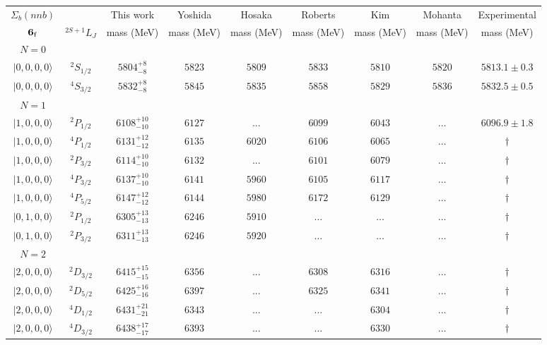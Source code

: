 \begin{tabular}{c c| c c c c c c c}\hline \hline
$\Sigma_{b}(nnb)$&                  & This work   &   Yoshida     &  Hosaka      &  Roberts    & Kim        & Mohanta    & Experimental  \\ 
${\bf {6}}_{\rm f}$  & $^{2S+1}L_{J}$ & mass (MeV)  &   mass (MeV)  &  mass (MeV)  &  mass (MeV) & mass (MeV) & mass (MeV) &      mass (MeV) \\ \hline
\hline
 $N=0$  &  &  &  &  &  \\ 
$\vert 0,0,0,0 \rangle $ & $^{2}S_{1/2}$ & $5804^{+8}_{-8}$ & $5823$ & $5809$ & $5833$ & $5810$ & $5820$ & $5813.1\pm 0.3$ \\ 
$\vert 0,0,0,0 \rangle $ & $^{4}S_{3/2}$ & $5832^{+8}_{-8}$ & $5845$ & $5835$ & $5858$ & $5829$ & $5836$ & $5832.5\pm 0.5$ \\ 
\hline
 $N=1$  &  &  &  &  &  \\ 
$\vert 1,0,0,0 \rangle $ & $^{2}P_{1/2}$ & $6108^{+10}_{-10}$ & $6127$ & ... & $6099$ & $6043$ & ... & $6096.9\pm 1.8$ \\ 
$\vert 1,0,0,0 \rangle $ & $^{4}P_{1/2}$ & $6131^{+12}_{-12}$ & $6135$ & $6020$ & $6106$ & $6065$ & ... & $\dagger$ \\ 
$\vert 1,0,0,0 \rangle $ & $^{2}P_{3/2}$ & $6114^{+10}_{-10}$ & $6132$ & ... & $6101$ & $6079$ & ... & $\dagger$ \\ 
$\vert 1,0,0,0 \rangle $ & $^{4}P_{3/2}$ & $6137^{+10}_{-10}$ & $6141$ & $5960$ & $6105$ & $6117$ & ... & $\dagger$ \\ 
$\vert 1,0,0,0 \rangle $ & $^{4}P_{5/2}$ & $6147^{+12}_{-12}$ & $6144$ & $5980$ & $6172$ & $6129$ & ... & $\dagger$ \\ 
$\vert 0,1,0,0 \rangle $ & $^{2}P_{1/2}$ & $6305^{+13}_{-13}$ & $6246$ & $5910$ & ... & ... & ... & $\dagger$ \\ 
$\vert 0,1,0,0 \rangle $ & $^{2}P_{3/2}$ & $6311^{+13}_{-13}$ & $6246$ & $5920$ & ... & ... & ... & $\dagger$ \\ 
\hline
 $N=2$  &  &  &  &  &  \\ 
$\vert 2,0,0,0 \rangle $ & $^{2}D_{3/2}$ & $6415^{+15}_{-15}$ & $6356$ & ... & $6308$ & $6316$ & ... & $\dagger$ \\ 
$\vert 2,0,0,0 \rangle $ & $^{2}D_{5/2}$ & $6425^{+16}_{-16}$ & $6397$ & ... & $6325$ & $6341$ & ... & $\dagger$ \\ 
$\vert 2,0,0,0 \rangle $ & $^{4}D_{1/2}$ & $6431^{+21}_{-21}$ & $6343$ & ... & ... & $6304$ & ... & $\dagger$ \\ 
$\vert 2,0,0,0 \rangle $ & $^{4}D_{3/2}$ & $6438^{+17}_{-17}$ & $6393$ & ... & ... & $6330$ & ... & $\dagger$ \\ 

\end{tabular}
